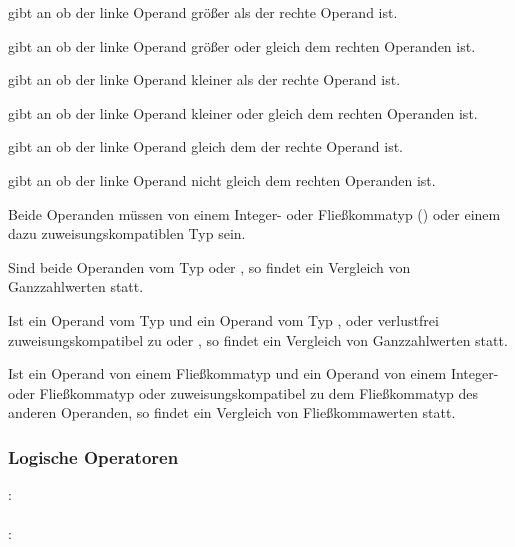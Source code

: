 \op{>} gibt an ob der linke Operand größer als der rechte Operand ist.

\op{>=} gibt an ob der linke Operand größer oder gleich dem rechten Operanden ist.

\op{<} gibt an ob der linke Operand kleiner als der rechte Operand ist.

\op{<=} gibt an ob der linke Operand kleiner oder gleich dem rechten Operanden ist.

\op{==} gibt an ob der linke Operand gleich dem der rechte Operand ist.

\op{!=} gibt an ob der linke Operand nicht gleich dem rechten Operanden ist.

Beide Operanden müssen von einem Integer- oder Fließkommatyp () oder einem
dazu zuweisungskompatiblen Typ sein.

Sind beide Operanden vom Typ  oder , so findet ein Vergleich von Ganzzahlwerten statt.

Ist ein Operand vom Typ  und ein Operand vom Typ ,  oder
verlustfrei zuweisungskompatibel zu  oder , so findet ein Vergleich von Ganzzahlwerten statt.

Ist ein Operand von einem Fließkommatyp und ein Operand von einem Integer- oder Fließkommatyp
oder zuweisungskompatibel zu dem Fließkommatyp des anderen Operanden,
so findet ein Vergleich von Fließkommawerten statt.


\subsubsection{Logische Operatoren}\label{Logische Operatoren}
:\label{asdr_logisch_oder}\\
\hspace*{1cm} \Gspace{}\\
:\label{asdr_logisch_und}\\
\hspace*{1cm} \Gspace{}\\


